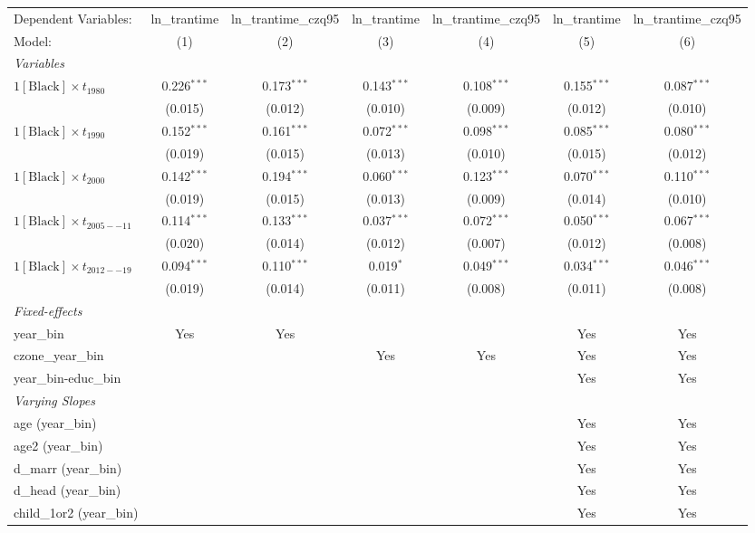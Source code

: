 \begin{tabular}{lcccccc}
\tabularnewline\midrule\midrule
Dependent Variables:&ln\_trantime&ln\_trantime\_czq95&ln\_trantime&ln\_trantime\_czq95&ln\_trantime&ln\_trantime\_czq95\\
Model:&(1) & (2) & (3) & (4) & (5) & (6)\\
\midrule \emph{Variables}&   &   &   &   &   &  \\
$1[\text{Black}] \times t_{1980}$ & 0.226$^{***}$ & 0.173$^{***}$ & 0.143$^{***}$ & 0.108$^{***}$ & 0.155$^{***}$ & 0.087$^{***}$\\
  &(0.015) & (0.012) & (0.010) & (0.009) & (0.012) & (0.010)\\
$1[\text{Black}] \times t_{1990}$ & 0.152$^{***}$ & 0.161$^{***}$ & 0.072$^{***}$ & 0.098$^{***}$ & 0.085$^{***}$ & 0.080$^{***}$\\
  &(0.019) & (0.015) & (0.013) & (0.010) & (0.015) & (0.012)\\
$1[\text{Black}] \times t_{2000}$ & 0.142$^{***}$ & 0.194$^{***}$ & 0.060$^{***}$ & 0.123$^{***}$ & 0.070$^{***}$ & 0.110$^{***}$\\
  &(0.019) & (0.015) & (0.013) & (0.009) & (0.014) & (0.010)\\
$1[\text{Black}] \times t_{2005--11}$ & 0.114$^{***}$ & 0.133$^{***}$ & 0.037$^{***}$ & 0.072$^{***}$ & 0.050$^{***}$ & 0.067$^{***}$\\
  &(0.020) & (0.014) & (0.012) & (0.007) & (0.012) & (0.008)\\
$1[\text{Black}] \times t_{2012--19}$ & 0.094$^{***}$ & 0.110$^{***}$ & 0.019$^{*}$ & 0.049$^{***}$ & 0.034$^{***}$ & 0.046$^{***}$\\
  &(0.019) & (0.014) & (0.011) & (0.008) & (0.011) & (0.008)\\
\midrule \emph{Fixed-effects}&   &   &   &   &   &  \\
year\_bin & Yes & Yes &  &  & Yes & Yes\\
czone\_year\_bin &  &  & Yes & Yes & Yes & Yes\\
year\_bin-educ\_bin &  &  &  &  & Yes & Yes\\
\midrule \emph{Varying Slopes}&   &   &   &   &   &  \\
age (year\_bin) &  &  &  &  & Yes & Yes\\
age2 (year\_bin) &  &  &  &  & Yes & Yes\\
d\_marr (year\_bin) &  &  &  &  & Yes & Yes\\
d\_head (year\_bin) &  &  &  &  & Yes & Yes\\
child\_1or2 (year\_bin) &  &  &  &  & Yes & Yes\\

\end{tabular}
